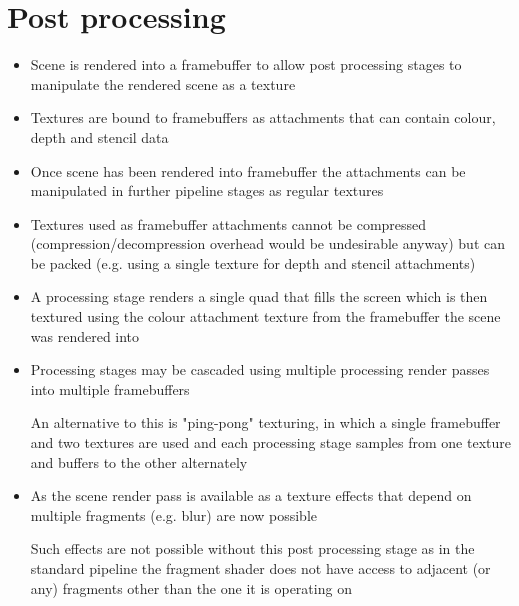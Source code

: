 \documentclass[a4paper]{article}
\begin{document}
\section{Post processing}

\begin{itemize}
  \item
    Scene is rendered into a framebuffer to allow post processing stages to
    manipulate the rendered scene as a texture

  \item
    Textures are bound to framebuffers as attachments that can contain colour,
    depth and stencil data

  \item
    Once scene has been rendered into framebuffer the attachments can be
    manipulated in further pipeline stages as regular textures

  \item
    Textures used as framebuffer attachments cannot be compressed
    (compression/decompression overhead would be undesirable anyway) but can be
    packed (e.g. using a single texture for depth and stencil attachments)

  \item
    A  processing stage renders a single quad that fills the screen which is
    then textured using the colour attachment texture from the framebuffer the
    scene was rendered into

  \item
    Processing stages may be cascaded using multiple processing render passes
    into multiple framebuffers

    An alternative to this is "ping-pong" texturing, in which a single
    framebuffer and two textures are used and each processing stage samples from
    one texture and buffers to the other alternately

  \item
    As the scene render pass is available as a texture effects that depend on
    multiple fragments (e.g. blur) are now possible

    Such effects are not possible without this post processing stage as in the
    standard pipeline the fragment shader does not have access to adjacent (or
    any) fragments other than the one it is operating on

\end{itemize}
\end{document}
